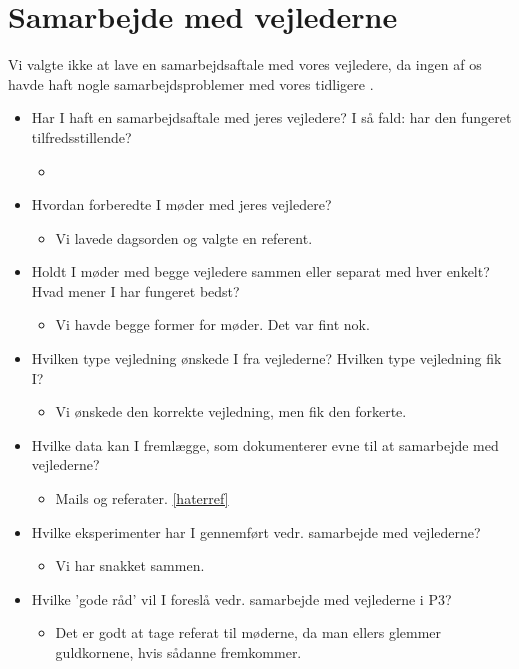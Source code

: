 \chapter{Samarbejde med vejlederne}
\label{H8R}


Vi valgte ikke at lave en samarbejdsaftale med vores vejledere, da ingen af os havde haft nogle samarbejdsproblemer med vores tidligere . 


\begin{itemize}
\item Har I haft en samarbejdsaftale med jeres vejledere? I så fald: har den fungeret tilfredsstillende?
\begin{itemize}
	\item 
\end{itemize}

\item Hvordan forberedte I møder med jeres vejledere?
\begin{itemize}
	\item Vi lavede dagsorden og valgte en referent.
\end{itemize}

\item Holdt I møder med begge vejledere sammen eller separat med hver enkelt? Hvad mener I har fungeret bedst?
\begin{itemize}
	\item Vi havde begge former for møder. Det var fint nok.
\end{itemize}

\item Hvilken type vejledning ønskede I fra vejlederne? Hvilken type vejledning fik I?
\begin{itemize}
	\item Vi ønskede den korrekte vejledning, men fik den forkerte.
\end{itemize}

\item Hvilke data kan I fremlægge, som dokumenterer evne til at samarbejde med vejlederne?
\begin{itemize}
	\item Mails og referater. \ref{haterref}
\end{itemize}

\item Hvilke eksperimenter har I gennemført vedr. samarbejde med vejlederne?
\begin{itemize}
	\item Vi har snakket sammen.
\end{itemize}

\item Hvilke ’gode råd’ vil I foreslå vedr. samarbejde med vejlederne i P3?
\begin{itemize}
	\item Det er godt at tage referat til møderne, da man ellers glemmer guldkornene, hvis sådanne fremkommer.
\end{itemize}

\end{itemize}